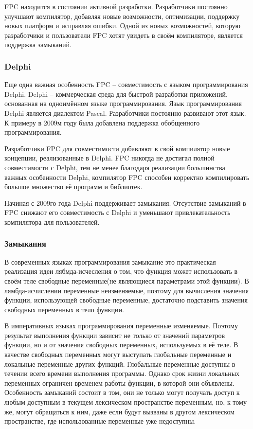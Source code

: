 \documentclass{imcs}
\begin{document}
FPC находится в состоянии активной разработки. Разработчики постоянно улучшают компилятор,
добавляя новые возможности, оптимизации, поддержку новых платформ и
исправляя ошибки\cite{fpc}.
Одной из новых возможностей, которую разработчики и пользователи FPC хотят увидеть в
своём компиляторе, является поддержка замыканий.

\subsubsection{Delphi}

Еще одна важная особенность FPC -- совместимость с языком программирования Delphi.
Delphi -- коммерческая среда для быстрой разработки приложений, основанная на одноимённом
языке программирования. Язык программирования Delphi является диалектом Pascal. 
Разработчики постоянно развивают этот язык. К примеру в 2009м году была добавлена 
поддержка обобщенного программирования.

Разработчики FPC для совместимости добавляют в свой компилятор новые концепции, реализованные
в Delphi. FPC никогда не достигал полной совместимости с Delphi, тем не менее благодаря
реализации большинства важных особенности Delphi, компилятор FPC способен корректно компилировать
большое множество её программ и библиотек.

Начиная с 2009го года Delphi поддерживает замыкания\cite{delphichange}. Отсутствие замыканий в FPC
снижают его совместимость с Delphi и уменьшают привлекательность компилятора для пользователей.

\subsubsection{Замыкания}
В современных языках программирования замыкание это практическая реализация
идеи лябмда-исчесления о том, что функция может использовать в своём теле свободные
переменные(не являющиеся параметрами этой функции). В лямбда-исчислении
переменные неизменяемые, поэтому для вычисления значения функции, использующей
свободные переменные, достаточно подставить значения свободных переменных в тело
функции\cite{lambdatutor}.

В императивных языках программирования переменные изменяемые.
Поэтому результат выполнения функции зависит не только от значений параметров
функции, но и от значения свободных переменных, используемых в её теле. В качестве
свободных переменных могут выступать глобальные переменные и локальные переменные
других функций. Глобальные переменные доступны в течении всего времени выполнения программы.
Однако срок жизни
локальных переменных ограничен временем работы функции, в которой они объявлены.
Особенность замыканий состоит в том, они не только могут получать доступ к любым
доступным в текущем лексическом пространстве переменным, но, к тому же, могут
обращаться к ним, даже если будут вызваны в другом лексическом пространстве, где
использованные переменные уже недоступны.
\end{document}

